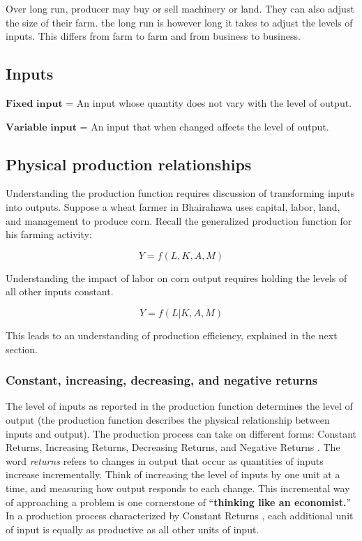 \documentclass[11pt,]{book}
\theoremstyle{definition}
\theoremstyle{definition}
\theoremstyle{definition}
\theoremstyle{remark}
\begin{document}
Over long run, producer may buy or sell machinery or land. They can also
adjust the size of their farm. the long run is however long it takes to
adjust the levels of inputs. This differs from farm to farm and from
business to business.

\subsection{Inputs}\label{inputs}

\(\textbf{Fixed input}\) = An input whose quantity does not vary with
the level of output.

\(\textbf{Variable input}\) = An input that when changed affects the
level of output.

\subsection{Physical production
relationships}\label{physical-production-relationships}

Understanding the production function requires discussion of
transforming inputs into outputs. Suppose a wheat farmer in Bhairahawa
uses capital, labor, land, and management to produce corn. Recall the
generalized production function for his farming activity:

\[Y = f(L, K, A, M)\]

Understanding the impact of labor on corn output requires holding the
levels of all other inputs constant.

\[Y = f(L|K, A, M)\]

This leads to an understanding of production efficiency, explained in
the next section.

\subsubsection{Constant, increasing, decreasing, and negative
returns}\label{constant-increasing-decreasing-and-negative-returns}

The level of inputs as reported in the production function determines
the level of output (the production function describes the physical
relationship between inputs and output). The production process can take
on different forms: Constant Returns, Increasing Returns, Decreasing
Returns, and Negative Returns . The word \emph{returns} refers to
changes in output that occur as quantities of inputs increase
incrementally. Think of increasing the level of inputs by one unit at a
time, and measuring how output responds to each change. This incremental
way of approaching a problem is one cornerstone of ``\textbf{thinking
like an economist.}'' In a production process characterized by Constant
Returns , each additional unit of input is equally as productive as all
other units of input.
\end{document}
